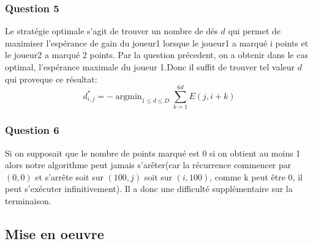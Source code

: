 \documentclass[12pt,a4paper]{article}
\begin{document}
\subsubsection{Question 5}
Le stratégie optimale s'agit de trouver un nombre de d\'es $d$ qui permet de maximiser l'esp\'erance de gain du joueur1 lorsque le joueur1 a marqué i points et le joueur2 a marqué 2 points. Par la question précedent, on a obtenir dans le cas optimal, l'esp\'erance maximale du joueur 1.Donc il suffit de trouver tel valeur $d$ qui proveque ce r\'esultat:  
\begin{equation*}
d^{*}_{i,j}=-\mathop{\arg\min}_{1 \leq d  \leq D}\sum\limits_{k=1}^{6d}E(j,i+k)
\end{equation*}

\subsubsection{Question 6}
Si on supposait que le nombre de points marqué est 0 si on obtient au moins 1 alors notre algorithme peut jamais s'ar\^eter(car la récurrence commencer par $(0,0)$ et s'arrête  soit sur $(100,j)$ soit sur $(i,100)$, comme k peut être 0, il peut s'exécuter infinitivement). Il a donc une difficulté supplémentaire sur la terminaison.

\subsection{Mise en oeuvre}
\end{document}
